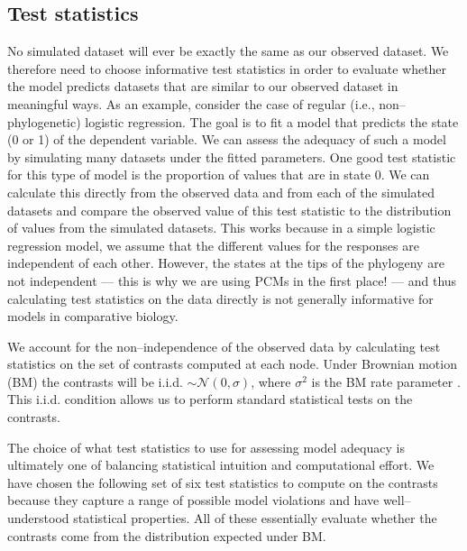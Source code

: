 \documentclass[a4paper,11pt]{article}
\begin{document}
\subsection{Test statistics}
No simulated dataset will ever be exactly the same as our observed dataset. We therefore need to choose informative test statistics in order to evaluate whether the model predicts datasets that are similar to our observed dataset in meaningful ways. As an example, consider the case of regular (i.e., non--phylogenetic) logistic regression. The goal is to fit a model that predicts the state (0 or 1) of the dependent variable. We can assess the adequacy of such a model by simulating many datasets under the fitted parameters. One good test statistic for this type of model is the proportion of values that are in state 0. We can calculate this directly from the observed data and from each of the simulated datasets and compare the observed value of this test statistic to the distribution of values from the simulated datasets. This works because in a simple logistic regression model, we assume that the different values for the responses are independent of each other. However, the states at the tips of the phylogeny are not independent --- this is why we are using PCMs in the first place! --- and thus calculating test statistics on the data directly is not generally informative for models in comparative biology. 

We account for the non--independence of the observed data by calculating test statistics on the set of contrasts \citep[i.e., ``phylogenetically independent contrasts'', \emph{sensu}][]{Felsenstein1985} computed at each node. \citep[We refer readers to][for details on how contrasts are calculated.]{Felsenstein1985, Rohlf2001, Blomberg2012} Under Brownian motion (BM) the contrasts will be i.i.d. $\sim \mathcal{N}(0, \sigma)$, where $\sigma^2$ is the BM rate parameter \citep{Felsenstein1985}. This i.i.d. condition allows us to perform standard statistical tests on the contrasts. 

The choice of what test statistics to use for assessing model adequacy is ultimately one of balancing statistical intuition and computational effort. We have chosen the following set of six test statistics to compute on the contrasts because they capture a range of possible model violations and have well--understood statistical properties. All of these essentially evaluate whether the contrasts come from the distribution expected under BM. 
\end{document}
